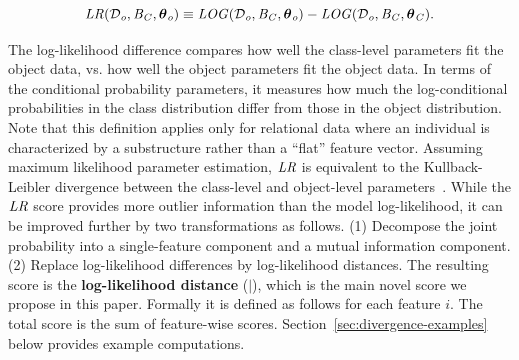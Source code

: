 \documentclass[conference]{IEEEtran}
\begin{document}
\begin{equation} \label{eq:log-diff}
\lr(\D_{\object},\model_{\Class},\parameters_{\object}) \equiv \loglikelihood(\D_{\object},\model_{\Class},\parameters_{\object}) - \loglikelihood(\D_{\object},\model_{\Class},\parameters_{\Class}).
\end{equation}

The log-likelihood difference compares  how well the class-level parameters fit the object data, vs. how well the object parameters fit the object data. In terms of the conditional probability parameters, it measures how much the log-conditional probabilities in the class distribution differ from those in the object distribution. Note that this definition applies only for relational data where an individual is characterized by a substructure rather than a ``flat'' feature vector. Assuming maximum likelihood parameter estimation, $\it{LR}$ is equivalent to the Kullback-Leibler divergence between the class-level and object-level parameters~\cite{Campos2006}. 
%
While the $\it{LR}$ score provides more outlier information than the model log-likelihood, it can be improved further by two transformations as follows. (1) Decompose the joint probability into a single-feature component and a mutual information component. (2) Replace log-likelihood differences by log-likelihood distances. The resulting score is the \textbf{log-likelihood distance} ($\mid$), which is the main novel score we propose in this paper. Formally it is defined as follows for each feature $i$. The total score is the sum of feature-wise scores. Section~\ref{sec:divergence-examples} 
 below provides example computations.
\end{document}
